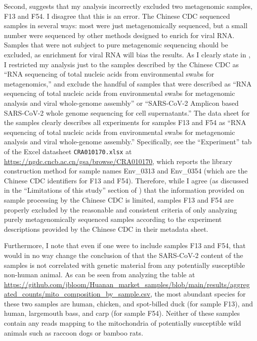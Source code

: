 \documentclass[9pt,twocolumn,twoside]{gsajnl_modified}
\begin{document}
Second, \citet{debarre2024what} suggests that my analysis incorrectly excluded two metagenomic samples, F13 and F54.
I disagree that this is an error.
The Chinese CDC sequenced samples in several ways: most were just metagenomically sequenced, but a small number were sequenced by other methods designed to enrich for viral RNA.
Samples that were not subject to pure metagenomic sequencing should be excluded, as enrichment for viral RNA will bias the results.
As I clearly state in \citet{bloom2023association}, I restricted my analysis just to the samples described by the Chinese CDC as ``RNA sequencing of total nucleic acids from environmental swabs for metagenomics,'' and exclude the handful of samples that were described as ``RNA sequencing of total nucleic acids from environmental swabs for metagenomic analysis and viral whole-genome assembly'' or ``SARS-CoV-2 Amplicon based SARS-CoV-2 whole genome sequencing for cell supernatants.''
The data sheet for the samples clearly describes all experiments for samples F13 and F54 as ``RNA sequencing of total nucleic acids from environmental swabs for metagenomic analysis and viral whole-genome assembly.'' 
Specifically, see the ``Experiment'' tab of the Excel datasheet \texttt{CRA010170.xlsx} at \url{https://ngdc.cncb.ac.cn/gsa/browse/CRA010170}, which reports the library construction method for sample names Env\_0313 and Env\_0354 (which are the Chinese CDC identifiers for F13 and F54).
Therefore, while I agree (as discussed in the ``Limitations of this study'' section of \citet{bloom2023association}) that the information provided on sample processing by the Chinese CDC is limited, samples F13 and F54 are properly excluded by the reasonable and consistent criteria of only analyzing purely metagenomically sequenced samples according to the experiment descriptions provided by the Chinese CDC in their metadata sheet.

Furthermore, I note that even if one were to include samples F13 and F54, that would in no way change the conclusion of \citet{bloom2023association} that the SARS-CoV-2 content of the samples is not correlated with genetic material from any potentially susceptible non-human animal.
As can be seen from analyzing the table at \url{https://github.com/jbloom/Huanan_market_samples/blob/main/results/aggregated_counts/mito_composition_by_sample.csv}, the most abundant species for these two samples are human, chicken, and spot-billed duck (for sample F13), and human, largemouth bass, and carp (for sample F54).
Neither of these samples contain any reads mapping to the mitochondria of potentially susceptible wild animals such as raccoon dogs or bamboo rats.
\end{document}
